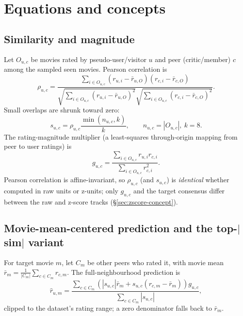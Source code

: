 \documentclass[11pt]{article}
\begin{document}
\section{Equations and concepts}
\label{sec:concepts}

\subsection{Similarity and magnitude}

Let $O_{u,c}$ be movies rated by pseudo-user/visitor $u$ and peer (critic/member) $c$ among the sampled seen movies. Pearson correlation is
\begin{equation}
\rho_{u,c}=
\frac{\sum_{i\in O_{u,c}}(r_{u,i}-\bar r_{u,O})(r_{c,i}-\bar r_{c,O})}
{\sqrt{\sum_{i\in O_{u,c}}(r_{u,i}-\bar r_{u,O})^2}
 \sqrt{\sum_{i\in O_{u,c}}(r_{c,i}-\bar r_{c,O})^2}}.
\label{eq:pearson}
\end{equation}
Small overlaps are shrunk toward zero:
\begin{equation}
s_{u,c}=\rho_{u,c}\frac{\min(n_{u,c},k)}{k},\qquad n_{u,c}=|O_{u,c}|,\ k=8.
\label{eq:shrink}
\end{equation}
The rating-magnitude multiplier (a least-squares through-origin mapping from peer to user ratings) is
\begin{equation}
g_{u,c}=\frac{\sum_{i\in O_{u,c}}r_{u,i}r_{c,i}}{\sum_{i\in O_{u,c}}r_{c,i}^{2}}.
\label{eq:magnitude}
\end{equation}
Pearson correlation is affine-invariant, so $\rho_{u,c}$ (and $s_{u,c}$) is \emph{identical} whether computed in raw units or z-units; only $g_{u,c}$ and the target consensus differ between the raw and z-score tracks (\S\ref{sec:zscore-concept}).

\subsection{Movie-mean-centered prediction and the top-$|$sim$|$ variant}
\label{sec:analytic-eq}

For target movie $m$, let $C_m$ be other peers who rated it, with movie mean $\bar r_m=\frac{1}{|C_m|}\sum_{c\in C_m}r_{c,m}$. The full-neighbourhood prediction is
\begin{equation}
\hat r_{u,m}=\frac{\sum_{c\in C_m}\left(|s_{u,c}|\bar r_m+s_{u,c}(r_{c,m}-\bar r_m)\right)g_{u,c}}{\sum_{c\in C_m}|s_{u,c}|},
\label{eq:prediction}
\end{equation}
clipped to the dataset's rating range; a zero denominator falls back to $\bar r_m$.
\end{document}
